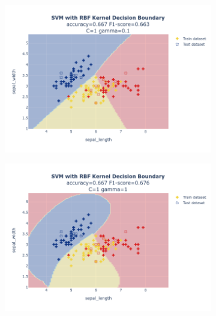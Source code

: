 \documentclass{article}
\begin{document}
\begin{figure}
\begin{subfigure}{0.3\textwidth}
        \includegraphics[scale=.13]{images/implementation/q1/rbf_kernel/sepal_length_sepal_width_1_0.1.png}
    \end{subfigure}
    \hfill
    \begin{subfigure}{0.3\textwidth}
        \centering
        \includegraphics[scale=.13]{images/implementation/q1/rbf_kernel/sepal_length_sepal_width_1_1.png}
    \end{subfigure}
    \hfill
    \begin{subfigure}{0.3\textwidth}
        \centering

\end{subfigure}
\end{figure}
\end{document}
